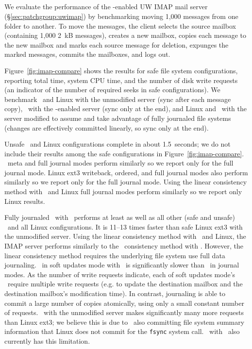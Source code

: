 \subsection {\Patchgroups}
\label{sec:evaluation:uwimap}


We evaluate the performance of the \patchgroup-enabled UW IMAP mail
server (\S\ref{sec:patchgroup:uwimap}) by benchmarking moving 1,000
messages from one folder to another.
%
To move the messages, the client selects the source mailbox (containing
1,000 2~kB messages), creates a new mailbox, copies each message to
the new mailbox and marks each source message for deletion, expunges
the marked messages, commits the mailboxes, and logs out.

Figure~\ref{fig:imap-compare} shows the results for safe file system
configurations,
%
reporting total time, system CPU time, and the number of disk write
requests (an indicator of the number of required seeks in safe
configurations).
%
We benchmark
%
\Kudos\ and Linux with the unmodified server (sync after each message
copy),
%
\Kudos\ with the \patchgroup-enabled server (sync only at the end),
%
and Linux and \Kudos\ with the server modified to assume and take
advantage of fully journaled file systems (changes are effectively
committed linearly, so sync only at the end).

Unsafe \Kudos\ and Linux configurations complete in about 1.5~seconds;
we do not include their results among the safe configurations in
Figure~\ref{fig:imap-compare}.
%
\Kudos\ meta and full journal modes perform similarly so we report
only for the full journal mode.
%
Linux ext3 writeback, ordered, and full journal modes also perform similarly
so we report only for the full journal mode.
%
Using the linear consistency method with \Kudos\ and Linux full
journal modes perform similarly so we report only Linux results.

Fully journaled \Kudos\ with \patchgroups\ performs at least as well
as all other (safe and unsafe) \Kudos\ and all Linux configurations.
It is 11--13 times faster than safe Linux ext3 with the unmodified
server.
%
Using the linear consistency method with \Kudos\ and Linux, the IMAP
server performs similarly to the \patchgroup\ consistency method with
\Kudos. However, the linear consistency method requires the underlying
file system use full data journaling.
%
\Kudos\ in soft updates mode with \patchgroups\ is significantly
slower than \Kudos\ in journal modes. As the number of write requests
indicate, each of soft updates mode's \patchgroups\ require multiple
write requests (e.g. to update the destination mailbox and the
destination mailbox's modification time). In contrast, journaling is
able to commit a large number of copies atomically, using only a small
constant number of requests.
%
\Kudos\ with the unmodified server makes significantly many more
requests than Linux ext3; we believe this is due to \Kudos\ also
committing file system summary information that Linux does not commit
for the \texttt{fsync} system call. \Kudos\ with \patchgroups\
also currently has this limitation.

